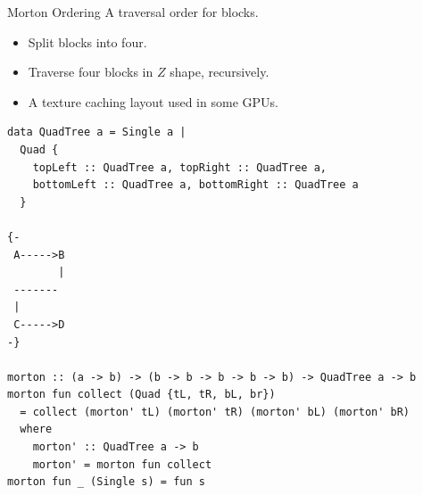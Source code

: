 \begin{definitionbox}{Morton Ordering}
    A traversal order for blocks.
    \begin{itemize}
        \item Split blocks into four.
        \item Traverse four blocks in $Z$ shape, recursively.
        \item A texture caching layout used in some GPUs.
    \end{itemize}
    \begin{verbatim}
data QuadTree a = Single a | 
  Quad { 
    topLeft :: QuadTree a, topRight :: QuadTree a, 
    bottomLeft :: QuadTree a, bottomRight :: QuadTree a
  }

{-
 A----->B
        |
 -------
 |
 C----->D
-}

morton :: (a -> b) -> (b -> b -> b -> b -> b) -> QuadTree a -> b
morton fun collect (Quad {tL, tR, bL, br}) 
  = collect (morton' tL) (morton' tR) (morton' bL) (morton' bR) 
  where
    morton' :: QuadTree a -> b
    morton' = morton fun collect
morton fun _ (Single s) = fun s
    \end{verbatim}
\end{definitionbox}
